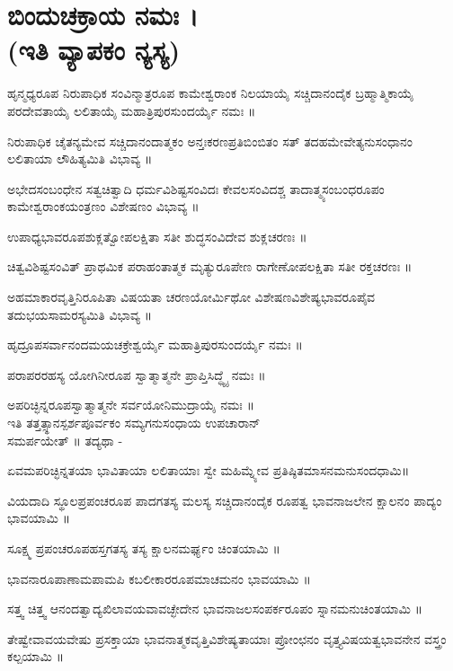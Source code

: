 \section{ಬಿಂದುಚಕ್ರಾಯ ನಮಃ ।\\ (ಇತಿ ವ್ಯಾಪಕಂ ನ್ಯಸ್ಯ)}
ಹೃನ್ಮಧ್ಯರೂಪ ನಿರುಪಾಧಿಕ ಸಂವಿನ್ಮಾತ್ರರೂಪ ಕಾಮೇಶ್ವರಾಂಕ ನಿಲಯಾಯೈ ಸಚ್ಚಿದಾನಂದೈಕ ಬ್ರಹ್ಮಾತ್ಮಿಕಾಯೈ ಪರದೇವತಾಯೈ ಲಲಿತಾಯೈ ಮಹಾತ್ರಿಪುರಸುಂದರ್ಯೈ ನಮಃ ॥

ನಿರುಪಾಧಿಕ ಚೈತನ್ಯಮೇವ ಸಚ್ಚಿದಾನಂದಾತ್ಮಕಂ ಅನ್ತಃಕರಣಪ್ರತಿಬಿಂಬಿತಂ ಸತ್ ತದಹಮೇವೇತ್ಯನುಸಂಧಾನಂ ಲಲಿತಾಯಾ ಲೌಹಿತ್ಯಮಿತಿ ವಿಭಾವ್ಯ ॥

ಅಭೇದಸಂಬಂಧೇನ ಸತ್ವಚಿತ್ವಾದಿ ಧರ್ಮವಿಶಿಷ್ಟಸಂವಿದಃ ಕೇವಲಸಂವಿದಶ್ಚ ತಾದಾತ್ಮ್ಯಸಂಬಂಧರೂಪಂ ಕಾಮೇಶ್ವರಾಂಕಯಂತ್ರಣಂ ವಿಶೇಷಣಂ ವಿಭಾವ್ಯ ॥

ಉಪಾಧ್ಯಭಾವರೂಪಶುಕ್ಲತ್ವೋಪಲಕ್ಷಿತಾ ಸತೀ ಶುದ್ಧಸಂವಿದೇವ ಶುಕ್ಲಚರಣಃ ॥

ಚಿತ್ವವಿಶಿಷ್ಟಸಂವಿತ್ ಪ್ರಾಥಮಿಕ ಪರಾಹಂತಾತ್ಮಕ ಮೃತ್ಯುರೂಪೇಣ ರಾಗೇಣೋಪಲಕ್ಷಿತಾ ಸತೀ ರಕ್ತಚರಣಃ ॥

ಅಹಮಾಕಾರವೃತ್ತಿನಿರೂಪಿತಾ ವಿಷಯತಾ ಚರಣಯೋರ್ಮಿಥೋ ವಿಶೇಷಣವಿಶೇಷ್ಯಭಾವರೂಪೈವ ತದುಭಯಸಾಮರಸ್ಯಮಿತಿ ವಿಭಾವ್ಯ ॥

ಹೃದ್ರೂಪಸರ್ವಾನಂದಮಯಚಕ್ರೇಶ್ವರ್ಯೈ ಮಹಾತ್ರಿಪುರಸುಂದರ್ಯೈ ನಮಃ ॥

ಪರಾಪರರಹಸ್ಯ ಯೋಗಿನೀರೂಪ ಸ್ವಾತ್ಮಾತ್ಮನೇ ಪ್ರಾಪ್ತಿಸಿದ್ಧ್ಯೈ ನಮಃ ॥

ಅಪರಿಚ್ಛಿನ್ನರೂಪಸ್ವಾತ್ಮಾತ್ಮನೇ ಸರ್ವಯೋನಿಮುದ್ರಾಯೈ ನಮಃ ॥\\
ಇತಿ ತತ್ತತ್ಸ್ಥಾನಸ್ಪರ್ಶಪೂರ್ವಕಂ ಸಮ್ಯಗನುಸಂಧಾಯ ಉಪಚಾರಾನ್\\ ಸಮರ್ಪಯೇತ್ ॥
ತದ್ಯಥಾ  -

ಏವಮಪರಿಚ್ಛಿನ್ನತಯಾ ಭಾವಿತಾಯಾ ಲಲಿತಾಯಾಃ ಸ್ವೇ ಮಹಿಮ್ನ್ಯೇವ ಪ್ರತಿಷ್ಠಿತಮಾಸನಮನುಸಂದಧಾಮಿ॥

ವಿಯದಾದಿ ಸ್ಥೂಲಪ್ರಪಂಚರೂಪ ಪಾದಗತಸ್ಯ ಮಲಸ್ಯ ಸಚ್ಚಿದಾನಂದೈಕ ರೂಪತ್ವ ಭಾವನಾಜಲೇನ ಕ್ಷಾಲನಂ ಪಾದ್ಯಂ ಭಾವಯಾಮಿ ॥

ಸೂಕ್ಷ್ಮ ಪ್ರಪಂಚರೂಪಹಸ್ತಗತಸ್ಯ ತಸ್ಯ ಕ್ಷಾಲನಮರ್ಘ್ಯಂ ಚಿಂತಯಾಮಿ ॥

ಭಾವನಾರೂಪಾಣಾಮಪಾಮಪಿ ಕಬಲೀಕಾರರೂಪಮಾಚಮನಂ ಭಾವಯಾಮಿ ॥

ಸತ್ತ್ವ ಚಿತ್ತ್ವ ಆನಂದತ್ವಾದ್ಯಖಿಲಾವಯವಾವಚ್ಛೇದೇನ ಭಾವನಾಜಲಸಂಪರ್ಕರೂಪಂ ಸ್ನಾನಮನುಚಿಂತಯಾಮಿ ॥

ತೇಷ್ವೇವಾವಯವೇಷು ಪ್ರಸಕ್ತಾಯಾ ಭಾವನಾತ್ಮಕವೃತ್ತಿವಿಶೇಷ್ಯತಾಯಾಃ ಪ್ರೋಂಛನಂ ವೃತ್ತ್ಯವಿಷಯತ್ವಭಾವನೇನ ವಸ್ತ್ರಂ ಕಲ್ಪಯಾಮಿ ॥

